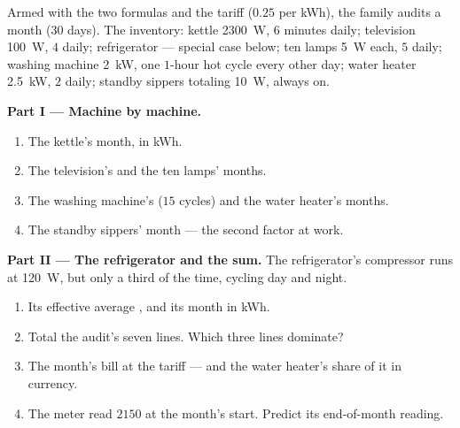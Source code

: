 \begin{problem}\label{pb:g9:electric-power-energy:1}
Armed with the two formulas and the tariff ($0.25$ per
\unit{kWh}), the family audits a month (30 days). The
inventory: kettle \qty{2300}{W}, $6$ minutes daily;
television \qty{100}{W}, $4$  daily; refrigerator ---
special case below; ten lamps \qty{5}{W} each, $5$ 
daily; washing machine \qty{2}{kW}, one $1$-hour hot cycle
every other day; water heater \qty{2.5}{kW}, $2$ 
daily; standby sippers totaling \qty{10}{W}, always on.

\medskip\noindent\textbf{Part I --- Machine by machine.}
\begin{enumerate}
  \item The kettle's month, in \unit{kWh}.
  \item The television's and the ten lamps' months.
  \item The washing machine's ($15$ cycles) and the water
        heater's months.
  \item The standby sippers' month --- the second factor at
        work.
\end{enumerate}

\medskip\noindent\textbf{Part II --- The refrigerator and
the sum.}
The refrigerator's compressor runs at \qty{120}{W}, but
only a third of the time, cycling day and night.
\begin{enumerate}[resume]
  \item Its effective average , and its month in
        \unit{kWh}.
  \item Total the audit's seven lines. Which three lines
        dominate?
  \item The month's bill at the tariff --- and the water
        heater's share of it in currency.
  \item The meter read $2150$  at the month's start.
        Predict its end-of-month reading.
\end{enumerate}


\end{problem}

